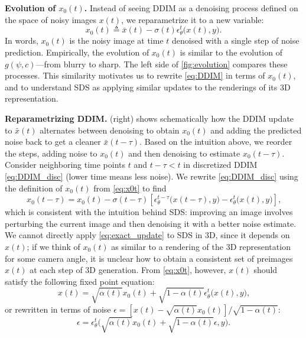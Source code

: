\textbf{Evolution of $x_0(t)$.} 
Instead of seeing DDIM as a denoising process defined on the space of noisy images $x(t)$, we reparametrize it to a new variable: 
\begin{equation}
    \label{eq:x0t}
    x_0(t) \triangleq \bar{x}(t) - \sigma(t) \epsilon_\theta^{t} \bigl( x(t), y\bigr).
\end{equation}
In words, $x_0(t)$ is the noisy image at time $t$ denoised with a single step of noise prediction.
Empirically, the evolution of $x_0(t)$ is similar to the evolution of $g(\psi, c)$---from blurry to sharp.
The left side of \cref{fig:evolution} compares these processes.
%
This similarity motivates us to rewrite \cref{eq:DDIM} in terms of $x_0(t)$, and to understand SDS as applying similar updates to the renderings of its 3D representation.

\textbf{Reparametrizing DDIM.} 
\label{section:reparametrization}
 (right) shows schematically how the DDIM update to $\bar{x}(t)$ alternates between denoising to obtain $x_0(t)$ and adding the predicted noise back to get a cleaner $\bar{x}(t - \tau)$.
%
Based on the intuition above, we reorder the steps, adding noise to
$x_0(t)$ and then denoising to estimate $x_0(t - \tau)$.
%
Consider neighboring time points $t$ and $t - \tau < t$ 
in discretized DDIM \cref{eq:DDIM_disc} (lower time means less noise). We rewrite \cref{eq:DDIM_disc} using the definition of $x_0(t)$ from \cref{eq:x0t} to find
\begin{equation}
    \label{eq:exact_update}
    x_0(t - \tau) =  x_0(t) - \sigma(t - \tau) \left[ 
                 \epsilon_\theta^{t - \tau}\bigl(x(t - \tau), y\bigr)
               - \epsilon_\theta^{t       }\bigl(x(t       ), y\bigr)
            \right] \text{,}
\end{equation}
which is consistent with the intuition behind SDS: improving an image 
involves perturbing the current image and then denoising it with a better noise estimate.
We cannot directly apply \cref{eq:exact_update} to SDS in 3D, since it depends on $x(t)$; if we think of $x_0(t)$ as similar to a rendering of the 3D representation for some camera angle, it is unclear how to obtain a consistent set of preimages $x(t)$ at each step of 3D generation. From \cref{eq:x0t}, however, $x(t)$ should satisfy the following fixed point equation:
\begin{equation}
    \label{eq:fixed_eq_x}
        x(t) = \sqrt{\alpha(t)} x_0(t) + \sqrt{1 - \alpha(t)} \epsilon_\theta^{t} \bigl( x(t), y\bigr) \text{,}
\end{equation}
or rewritten in terms of noise $\epsilon = [ x(t) - \sqrt{\alpha(t)} x_0(t) ] / \sqrt{1 - \alpha(t)} $:%
\begin{equation}
    \label{eq:fixed_eq_eps}
        \epsilon = \epsilon_\theta^{t} \bigl( \sqrt{\alpha(t)} x_0(t) + \sqrt{1 - \alpha(t)} \epsilon, y\bigr) \text{.}
\end{equation}

